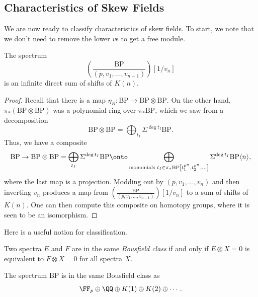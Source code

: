 \documentclass[../notes.tex]{subfiles}
\begin{document}
\subsection{Characteristics of Skew Fields}
We are now ready to classify characteristics of skew fields. To start, we note that we don't need to remove the lower $v$s to get a free module.
\begin{proposition} \label{prop:many-mods-is-still-free}
	The spectrum
	\[\left(\frac{\mathrm{BP}}{(p,v_1,\ldots,v_{n-1})}\right)[1/v_n]\]
	is an infinite direct sum of shifts of $K(n)$.
\end{proposition}
\begin{proof}
	Recall that there is a map $\eta_R\colon\mathrm{BP}\to\mathrm{BP}\otimes\mathrm{BP}$. On the other hand, $\pi_*(\mathrm{BP}\otimes\mathrm{BP})$ was a polynomial ring over $\pi_*\mathrm{BP}$, which we saw from a decomposition
	\[\mathrm{BP}\otimes\mathrm{BP}=\bigoplus_{t_I}\Sigma^{\deg t_I}\mathrm{BP}.\]
	Thus, we have a composite
	\[\mathrm{BP}\to\mathrm{BP}\otimes\mathrm{BP}=\bigoplus_{t_I}\Sigma^{\deg t_I}\mathrm{BP}\onto\bigoplus_{\text{monomials }t_I\in\pi_*\mathrm{BP}\left[t_1^{p^n},t_2^{p^n},\ldots\right]}\Sigma^{\deg t_I}\mathrm{BP}\langle n\rangle,\]
	where the last map is a projection. Modding out by $(p,v_1,\ldots,v_n)$ and then inverting $v_n$ produces a map from $\left(\frac{\mathrm{BP}}{(p,v_1,\ldots,v_{n-1})}\right)[1/v_n]$ to a sum of shifts of $K(n)$. One can then compute this composite on homotopy groups, where it is seen to be an isomorphism.
\end{proof}
Here is a useful notion for classification.
\begin{definition}
	Two spectra $E$ and $F$ are in the same \textit{Bousfield class} if and only if $E\otimes X=0$ is equivalent to $F\otimes X=0$ for all spectra $X$.
\end{definition}
\begin{proposition} \label{prop:bp-bousfield}
	The spectrum $\mathrm{BP}$ is in the same Bousfield class as
	\[\FF_p\oplus\QQ\oplus K(1)\oplus K(2)\oplus\cdots.\]
\end{proposition}
\end{document}
